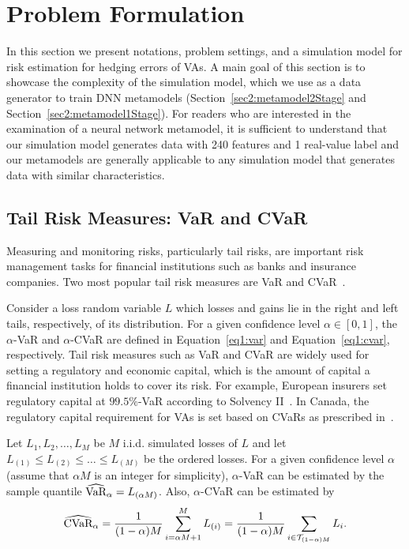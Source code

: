 \section{Problem Formulation} \label{sec2:problem-formulation}

In this section we present notations, problem settings, and a simulation model for risk estimation for hedging errors of VAs.
A main goal of this section is to showcase the complexity of the simulation model, which we use as a data generator to train DNN metamodels (Section~\ref{sec2:metamodel2Stage} and Section~\ref{sec2:metamodel1Stage}).
For readers who are interested in the examination of a neural network metamodel, it is sufficient to understand that our simulation model generates data with 240 features and 1 real-value label and our metamodels are generally applicable to any simulation model that generates data with similar characteristics.

\subsection{Tail Risk Measures: VaR and CVaR}
Measuring and monitoring risks, particularly tail risks, are important risk management tasks for financial institutions such as banks and insurance companies.
Two most popular tail risk measures are VaR and CVaR~\citep{hardy2022quantitative, rockafellar2002conditional}. 

Consider a loss random variable $L$ which losses and gains lie in the right and left tails, respectively, of its distribution.
For a given confidence level $\alpha\in [0,1]$, the $\alpha$-VaR and $\alpha$-CVaR are defined in Equation~\eqref{eq1:var} and Equation~\eqref{eq1:cvar}, respectively.
Tail risk measures such as VaR and CVaR are widely used for setting a regulatory and economic capital, which is the amount of capital a financial institution holds to cover its risk.
For example, European insurers set regulatory capital at $99.5\%$-VaR according to Solvency II~\cite{eiopa2014underlying}.
In Canada, the regulatory capital requirement for VAs is set based on CVaRs as prescribed in~\cite{osfi2017life}.

Let $L_1,L_2,\ldots,L_M$ be $M$ i.i.d. simulated losses of $L$ and let $L_{(1)}\leq L_{(2)}\leq \ldots\leq L_{(M)}$ be the ordered losses.
For a given confidence level $\alpha$ (assume that $\alpha M$ is an integer for simplicity), $\alpha$-VaR can be estimated by the sample quantile $\widehat{\mbox{VaR}}_\alpha = L_{(\alpha M)}$. Also, $\alpha$-CVaR can be estimated by
\begin{equation} \label{eq2:cvar-hat}
    \widehat{\mbox{CVaR}}_\alpha = \frac{1}{(1-\alpha)M} \sum_{i=\alpha M + 1}^{M}L_{(i)} = \frac{1}{(1-\alpha)M} \sum_{i \in \mathcal{T}_{(1-\alpha )M}}L_{i}.
\end{equation}

